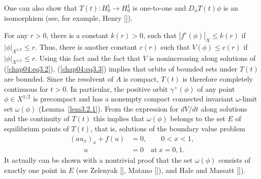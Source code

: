 \documentclass{surv-l}
\theoremstyle{plain}
\theoremstyle{definition}
\numberwithin{equation}{section}
\numberwithin{figure}{chapter}
\begin{document}
One can also show that $T(t)\!:H_{0}^{1}\rightarrow H_{0}^{1}$ is one-to-one and $ D_{\phi}T(t)\phi$ is an isomorphism (see, for example, Henry [\citeyear{1981henry}]).

For any $r>0$, there is a constant $k(r) >0$, such that $|f^{e}(\phi)|_X\leq k(r)$ if $|\phi|_{X^{1/2}}\leq r$. Thus, there is another constant $c(r)$ such that $V(\phi)\leq c(r)$ if $|\phi|_{X^{1/2}}\leq r$. Using this fact and the fact that $V$ is nonincreasing along solutions of (\ref{chap04:eq3.2}), (\ref{chap04:eq3.3}) implies that orbits of bounded sets under $T(t)$ are bounded. Since the resolvent of $A$ is compact, $T(t)$ is therefore completely continuous for $t>0$. In particular, the positive orbit $\gamma^{+}(\phi)$ of any point $\phi\in X^{1/2}$ is precompact and has a nonempty compact connected invariant $\omega$-limit set $\omega(\phi)$ (Lemma~\ref{lem3.2.1}). From the expression for $dV/dt$ along solutions and the continuity of $T(t)$ this implies that $\omega(\phi)$ belongs to the set $E$ of equilibrium points of $T(t)$, that is, solutions of the boundary value problem
\begin{equation}\label{chap04:eq3.6}
\begin{split}
(au_{x})_{x}+f(u)&=0,\qquad 0<x<1,\\
\qquad u&=0\quad \mathrm{at}\ x=0,1.
\end{split}
\end{equation}
It actually can be shown with a nontrivial proof that the set $\omega(\phi)$ consists of exactly one point in $E$ (see Zelenyak [\citeyear{1968z}], Matano [\citeyear{1978m}]), and Hale and Massatt [\citeyear{1982hm}]).
\end{document}
